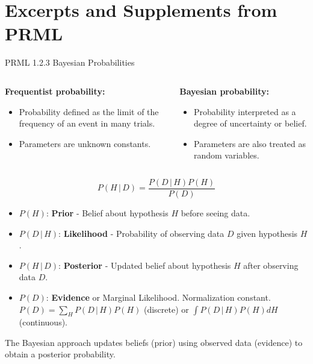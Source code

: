 \documentclass{beamer} %
\newcommand{\given}{\,|\,}
\begin{document}
\section{Excerpts and Supplements from PRML}
\begin{frame}{PRML 1.2.3 Bayesian Probabilities}
  \begin{columns}[T]
  \begin{column}{0.5\textwidth}
    \textbf{Frequentist probability:}
    \begin{itemize}
        \item Probability defined as the limit of the frequency of an event in many trials.
        \item Parameters are unknown constants.
    \end{itemize}
  \end{column}
  \begin{column}{0.5\textwidth}
    \textbf{Bayesian probability:}
    \begin{itemize}
        \item Probability interpreted as a degree of uncertainty or belief.
        \item Parameters are also treated as random variables.
    \end{itemize}
  \end{column}
  \end{columns}
  \vspace{1em}
  \begin{thm}
  \label{thm:bayes_eng}
  \begin{equation*}
    P(H \given D) = \frac{P(D \given H)P(H)}{P(D)}
  \end{equation*}
  \end{thm}
  \begin{itemize}
    \item $P(H)$: \textbf{Prior} - Belief about hypothesis $H$ before seeing data.
    \item $P(D \given H)$: \textbf{Likelihood} - Probability of observing data $D$ given hypothesis $H$.
    \item $P(H \given D)$: \textbf{Posterior} - Updated belief about hypothesis $H$ after observing data $D$.
    \item $P(D)$: \textbf{Evidence} or Marginal Likelihood. Normalization constant.
      $P(D) = \sum_H P(D \given H)P(H)$ (discrete) or $\int P(D \given H)P(H)dH$ (continuous).
  \end{itemize}
  The Bayesian approach updates beliefs (prior) using observed data (evidence) to obtain a posterior probability.
\end{frame}
\end{document}
